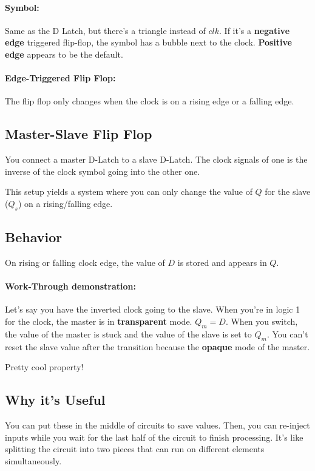 \documentclass[a4paper,12pt]{report}
\begin{document}
\paragraph{Symbol: } Same as the D Latch, but there's a triangle instead of $clk$. If 
it's a \textbf{negative edge} triggered flip-flop, the symbol has a bubble next to the 
clock. \textbf{Positive edge} appears to be the default. 

\paragraph{Edge-Triggered Flip Flop: } The flip flop only changes when the clock is 
on a rising edge or a falling edge. 

\subsection{Master-Slave Flip Flop}
You connect a master D-Latch to a slave D-Latch. The clock signals of one is the inverse 
of the clock symbol going into the other one. 

This setup yields a system where you can only change the value of $Q$ for the slave ($Q_s$) 
on a rising/falling edge. 

\subsection{Behavior} On rising or falling clock edge, the value of $D$ is stored and 
appears in $Q$.

\paragraph{Work-Through demonstration: } Let's say you have the inverted clock going 
to the slave. When you're in logic 1 for the clock, the master is in \textbf{transparent} 
mode. $Q_m = D$. When you switch, the value of the master is stuck and the value of the 
slave is set to $Q_m$. You can't reset the slave value after the transition because the 
\textbf{opaque} mode of the master. 

Pretty cool property! 

\subsection{Why it's Useful}

You can put these in the middle of circuits to save values. Then, you can re-inject inputs 
while you wait for the last half of the circuit to finish processing. It's like splitting 
the circuit into two pieces that can run on different elements simultaneously. 
\end{document}
